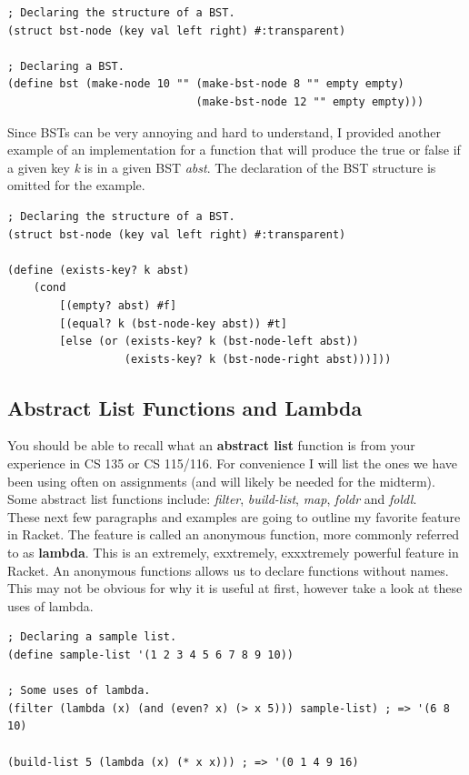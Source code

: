 \documentclass[12pt,extarticle]{article}
\begin{document}
\lstset {
	language=Lisp
}
\begin{lstlisting}
; Declaring the structure of a BST.
(struct bst-node (key val left right) #:transparent)

; Declaring a BST.
(define bst (make-node 10 "" (make-bst-node 8 "" empty empty)
                             (make-bst-node 12 "" empty empty)))
\end{lstlisting}

Since BSTs can be very annoying and hard to understand, I provided another example of an implementation for a function that will produce the true or false if a given key \emph{k} is in a given BST \emph{abst}. The declaration of the BST structure is omitted for the example.\\

\lstset {
	language=Lisp
}
\begin{lstlisting}
; Declaring the structure of a BST.
(struct bst-node (key val left right) #:transparent)

(define (exists-key? k abst)
	(cond
		[(empty? abst) #f]
		[(equal? k (bst-node-key abst)) #t]
		[else (or (exists-key? k (bst-node-left abst))
		          (exists-key? k (bst-node-right abst)))]))
\end{lstlisting}

\subsection{Abstract List Functions and Lambda}

You should be able to recall what an \textbf{abstract list} function is from your experience in CS 135 or CS 115/116. For convenience I will list the ones we have been using often on assignments (and will likely be needed for the midterm). Some abstract list functions include: \emph{filter}, \emph{build-list}, \emph{map}, \emph{foldr} and \emph{foldl}.\\

These next few paragraphs and examples are going to outline my favorite feature in Racket. The feature is called an anonymous function, more commonly referred to as \textbf{lambda}. This is an extremely, exxtremely, exxxtremely powerful feature in Racket. An anonymous functions allows us to declare functions without names. This may not be obvious for why it is useful at first, however take a look at these uses of lambda.\\

\lstset {
	language=Lisp
}
\begin{lstlisting}
; Declaring a sample list.
(define sample-list '(1 2 3 4 5 6 7 8 9 10))

; Some uses of lambda.
(filter (lambda (x) (and (even? x) (> x 5))) sample-list) ; => '(6 8 10)

(build-list 5 (lambda (x) (* x x))) ; => '(0 1 4 9 16)
\end{lstlisting}
\end{document}
